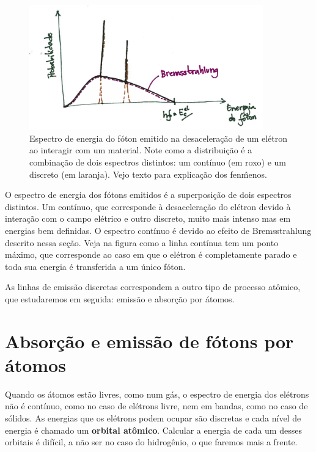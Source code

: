 \documentclass{article}
\begin{document}
\begin{figure}[ht]
\includegraphics[width=0.9\textwidth]{brem.png}
\caption{\label{fig:brem}Espectro de energia do f\'oton emitido na desacelera\c c\~ao de um el\'etron ao interagir com um material. Note como a distribui\c c\~ao \'e a combina\c c\~ao de dois espectros distintos: um cont\'inuo (em roxo) e um discreto (em laranja). Vejo texto para explica\c c\~ao dos fen\^menos.}
\end{figure}
O espectro de energia dos f\'otons emitidos \'e a superposi\c c\~ao de dois espectros distintos. Um cont\'inuo, que corresponde \`a desacelera\c c\~ao do el\'etron devido \`a intera\c c\~ao com o campo el\'etrico e outro discreto, muito mais intenso mas em energias bem definidas. O espectro cont\'inuo \'e devido ao efeito de Bremsstrahlung descrito nessa se\c c\~ao. Veja na figura como a linha cont\'inua tem um ponto m\'aximo, que corresponde ao caso em que o el\'etron \'e completamente parado e toda sua energia \'e transferida a um \'unico f\'oton.

As linhas de emiss\~ao discretas correspondem a outro tipo de processo at\^omico, que estudaremos em seguida: emiss\~ao e absor\c c\~ao por \'atomos.

\section{Absor\c c\~ao e emiss\~ao de f\'otons por \'atomos}\label{abs}

Quando os \'atomos est\~ao livres, como num g\'as, o espectro de energia dos el\'etrons n\~ao \'e cont\'inuo, como no caso de el\'etrons livre, nem em bandas, como no caso de s\'olidos. As energias que os el\'etrons podem ocupar s\~ao discretas e cada n\'ivel de energia \'e chamado um \textbf{orbital at\^omico}. Calcular a energia de cada um desses orbitais \'e dif\'icil, a n\~ao ser no caso do hidrog\^enio, o que faremos mais a frente.
\end{document}
